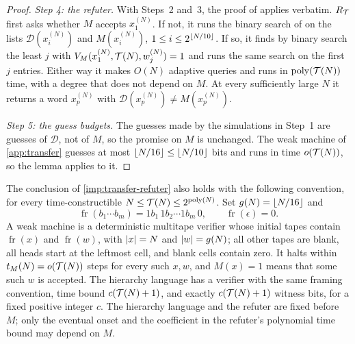 \begin{proof}
\emph{Step 4: the refuter.} With Steps~2 and~3, the proof of
\cite[Theorem~4.6]{CLW20} applies verbatim. \(R_{\mathcal T}\) first asks
whether \(M\) accepts \(x^{(N)}_1\). If not, it runs the binary search of
\cite[Corollary~4.5]{CLW20} on the lists \(\mathcal D(x^{(N)}_i)\) and
\(M(x^{(N)}_i)\), \(1\le i\le2^{\left\lfloor N/10\right\rfloor}\). If so, it finds by
binary search the least \(j\) with \(V_M(x^{(N)}_1,\mathcal T(N),w^{(N)}_j)=1\)
and runs the same search on the first \(j\) entries. Either way it makes
\(O(N)\) adaptive queries and runs in \(\operatorname{poly}(\mathcal T(N))\) time, with a
degree that does not depend on \(M\). At every sufficiently large \(N\) it
returns a word \(x^{(N)}_p\) with \(\mathcal D(x^{(N)}_p)\ne M(x^{(N)}_p)\).

\emph{Step 5: the guess budgets.} The guesses made by the simulations in
Step~1 are guesses of \(\mathcal D\), not of \(M\), so the promise on \(M\)
is unchanged. The weak machine of
\cref{app:transfer} guesses at most
\(\left\lfloor N/16\right\rfloor\le\left\lfloor N/10\right\rfloor\) bits and runs in time \(o(\mathcal T(N))\), so
the lemma applies to it.
\end{proof}

\begin{corollary}\label{earlier:r:cor:framed-refuter}\label{earlier:g:cor:framed-refuter}
The conclusion of \cref{imp:transfer-refuter} also holds with the following
convention, for every time-constructible
\(N\le\mathcal T(N)\le2^{\operatorname{poly}(N)}\). Set \(g(N)=\left\lfloor N/16\right\rfloor\) and
\[
 \operatorname{fr}(b_1\cdots b_m)=1b_1\,1b_2\cdots1b_m\,0,
 \qquad \operatorname{fr}(\epsilon)=0.
\]
A weak machine is a deterministic multitape verifier whose initial
tapes contain \(\operatorname{fr}(x)\) and
\(\operatorname{fr}(w)\), with \(\left|x\right|=N\) and \(\left|w\right|=g(N)\);
all other tapes are blank, all heads start at the leftmost cell, and
blank cells contain zero. It halts within \(t_M(N)=o(\mathcal T(N))\)
steps for every such \(x,w\), and \(M(x)=1\) means that some such
\(w\) is accepted. The hierarchy language has a verifier with the
same framing convention, time bound \(c(\mathcal T(N)+1)\), and exactly
\(c(\mathcal T(N)+1)\) witness bits, for a fixed positive integer \(c\).
The hierarchy language and the refuter are fixed before \(M\); only
the eventual onset and the coefficient in the refuter's polynomial
time bound may depend on \(M\).
\end{corollary}

